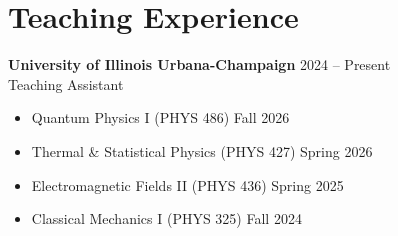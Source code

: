 \documentclass[11pt]{article}
\newcommand{\entry}[2]{\textbf{#1} \hfill #2 \\}
\begin{document}
\section*{Teaching Experience}
\entry{University of Illinois Urbana-Champaign}{2024 -- Present}
Teaching Assistant
\begin{itemize}
  \item Quantum Physics I (PHYS 486) \hfill Fall 2026
  \item Thermal \& Statistical Physics (PHYS 427) \hfill Spring 2026
  \item Electromagnetic Fields II (PHYS 436) \hfill Spring 2025
  \item Classical Mechanics I (PHYS 325) \hfill Fall 2024
\end{itemize}

\end{document}
